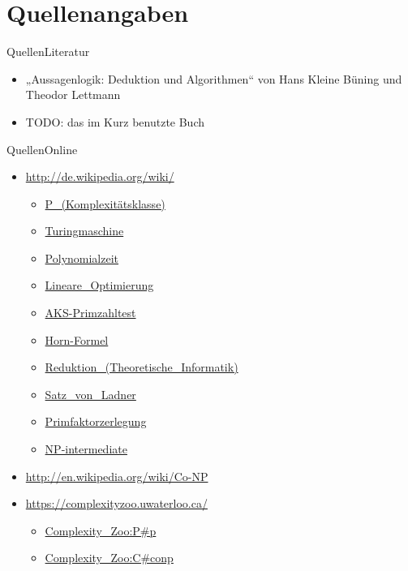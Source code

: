 \documentclass[ignorenonframetext,]{beamer}
\begin{document}
\section{Quellenangaben}\label{quellenangaben}

\begin{frame}{Quellen}{Literatur}
\begin{itemize}
	\item „Aussagenlogik: Deduktion und Algorithmen“ von Hans Kleine Büning und Theodor Lettmann
	\item TODO: das im Kurz benutzte Buch
\end{itemize}
\end{frame}

\begin{frame}{Quellen}{Online}

\begin{itemize}
	\item \url{http://de.wikipedia.org/wiki/}
		\begin{itemize}
			\item \url{P\_(Komplexitätsklasse)}
			\item \url{Turingmaschine}
			\item \url{Polynomialzeit}
			\item \url{Lineare\_Optimierung}
			\item \url{AKS-Primzahltest}
			\item \url{Horn-Formel}
			\item \url{Reduktion\_(Theoretische\_Informatik)}
			\item \url{Satz\_von\_Ladner}
			\item \url{Primfaktorzerlegung}
			\item \url{NP-intermediate}
		\end{itemize}
	\item \url{http://en.wikipedia.org/wiki/Co-NP}
	\item \url{https://complexityzoo.uwaterloo.ca/}
		\begin{itemize}
			\item \url{Complexity\_Zoo:P\#p}
			\item \url{Complexity\_Zoo:C\#conp}
		\end{itemize}
\end{itemize}
\end{frame}
\end{document}
